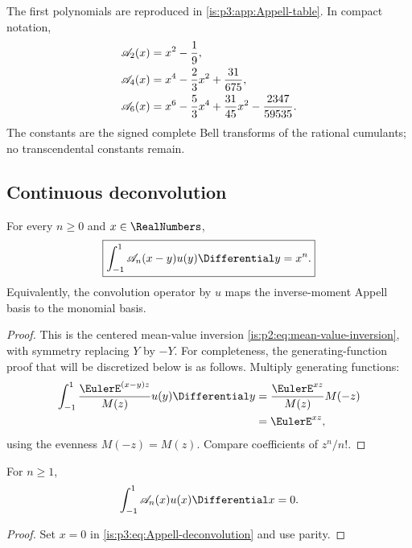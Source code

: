 The first polynomials are reproduced in \cref{is:p3:app:Appell-table}.  In compact notation,
\begin{align*}
 \mathscr A_2(x)&=x^2-\frac19,\\
 \mathscr A_4(x)&=x^4-\frac23x^2+\frac{31}{675},\\
 \mathscr A_6(x)&=x^6-\frac53x^4+\frac{31}{45}x^2-\frac{2347}{59535}.
\end{align*}
The constants are the signed complete Bell transforms of the rational cumulants; no transcendental constants remain.

\subsection{Continuous deconvolution}

\begin{theorem}
\label{is:p3:thm:Appell-deconvolution}
For every $n\ge0$ and $x\in\RealNumbers$,
\begin{equation}
 \boxed{\displaystyle
 \int_{-1}^{1}\Acal_n(x-y)u(y)\Differential y=x^n.}
 \label{is:p3:eq:Appell-deconvolution}
\end{equation}
Equivalently, the convolution operator by $u$ maps the inverse-moment Appell basis to the monomial basis.
\end{theorem}

\begin{proof}
This is the centered mean-value inversion
\eqref{is:p2:eq:mean-value-inversion}, with symmetry replacing $Y$ by $-Y$.
For completeness, the generating-function proof that will be discretized
below is as follows.  Multiply generating functions:
\begin{align*}
 \int_{-1}^{1}\frac{\EulerE^{(x-y)z}}{M(z)}u(y)\Differential y
 &=\frac{\EulerE^{xz}}{M(z)}M(-z)\\
 &=\EulerE^{xz},
\end{align*}
using the evenness $M(-z)=M(z)$.  Compare coefficients of $z^n/n!$.
\end{proof}

\begin{corollary}
\label{is:p3:cor:Appell-mean-zero}
For $n\ge1$,
\begin{equation}
 \int_{-1}^{1}\Acal_n(x)u(x)\Differential x=0.
 \label{is:p3:eq:Appell-mean-zero}
\end{equation}
\end{corollary}

\begin{proof}
Set $x=0$ in \eqref{is:p3:eq:Appell-deconvolution} and use parity.
\end{proof}

